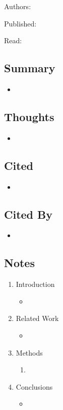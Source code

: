 \documentclass{article}
\begin{document}
\noindent Authors: 

\noindent Published:

\noindent Read:

\subsection*{Summary}
\begin{itemize}
	\item
\end{itemize}

\subsection*{Thoughts}
\begin{itemize}
	\item
\end{itemize}

\subsection*{Cited}
\begin{itemize}
	\item
\end{itemize}

\subsection*{Cited By}
\begin{itemize}
	\item
\end{itemize}

\subsection*{Notes}

\begin{enumerate}
	\item Introduction
	\begin{itemize}
		\item 
	\end{itemize}
	\item Related Work
	\begin{itemize}
		\item 
	\end{itemize}
	\item Methods
	\begin{enumerate}
		\item 
	\end{enumerate}
	\item Conclusions
	\begin{itemize}
		\item 
	\end{itemize}
\end{enumerate}
\end{document}
